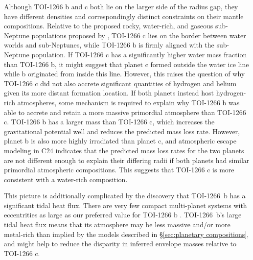 \documentclass[twocolumn]{aastex631}
\begin{document}
Although TOI-1266 b and c both lie on the larger side of the radius gap, they have different densities and correspondingly distinct constraints on their mantle compositions. Relative to the proposed rocky, water-rich, and gaseous sub-Neptune populations proposed by \cite{Luque_2022}, TOI-1266 c lies on the border between water worlds and sub-Neptunes, while TOI-1266 b is firmly aligned with the sub-Neptune population. If TOI-1266 c has a significantly higher water mass fraction than TOI-1266 b, it might suggest that planet c formed outside the water ice line while b originated from inside this line. However, this raises the question of why TOI-1266 c did not also accrete significant quantities of hydrogen and helium given its more distant formation location. If both planets instead host hydrogen-rich atmospheres, some mechanism is required to explain why TOI-1266 b was able to accrete and retain a more massive primordial atmosphere than TOI-1266 c. TOI-1266 b has a larger mass than TOI-1266 c, which increases the gravitational potential well and reduces the predicted mass loss rate. However, planet b is also more highly irradiated than planet c, and atmospheric escape modeling in C24 indicates that the predicted mass loss rates for the two planets are not different enough to explain their differing radii if both planets had similar primordial atmospheric compositions. This suggests that TOI-1266 c is more consistent with a water-rich composition.

This picture is additionally complicated by the discovery that TOI-1266~b has a significant tidal heat flux. There are very few compact multi-planet systems with eccentrities as large as our preferred value for TOI-1266 b \citep[e.g.,][]{VanEylen19, He2020}. TOI-1266~b's large tidal heat flux means that its atmosphere may be less massive and/or more metal-rich than implied by the models described in \S\ref{sec:planetary compositions}, and might help to reduce the disparity in inferred envelope masses relative to TOI-1266 c.

\end{document}
